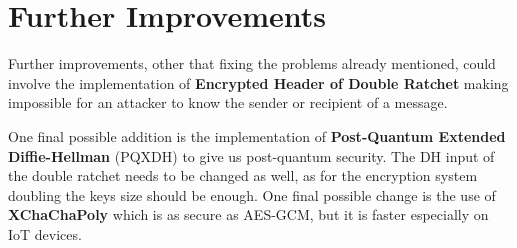 \section{Further Improvements}
\label{sec:FurtherImpromvements}

Further improvements, other that fixing the problems already mentioned, could involve the implementation of \textbf{Encrypted Header of Double Ratchet} making impossible for an attacker to know the sender or recipient of a message.

One final possible addition is the implementation of \textbf{Post-Quantum Extended Diffie-Hellman} (PQXDH) to give us post-quantum security. The DH input of the double ratchet needs to be changed as well, as for the encryption system doubling the keys size should be enough. One final possible change is the use of \textbf{XChaChaPoly} which is as secure as AES-GCM, but it is faster especially on IoT devices.
